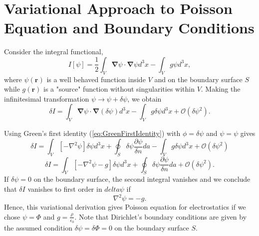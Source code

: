 \section{Variational Approach to Poisson Equation and Boundary Conditions}

Consider the integral functional,
\begin{equation}
I[\psi] = \frac{1}{2} \int_V \boldsymbol{\nabla} \psi \cdot \boldsymbol{\nabla} \psi d^3x - \int_V g\psi d^3x,
\end{equation}
where $\psi(\textbf{r})$ is a well behaved function inside $V$ and on the boundary surface $S$ while $g(\textbf{r})$ is a "source" function without singularities within $V$. Making the infinitesimal transformation $\psi \rightarrow \psi + \delta \psi $, we obtain
\begin{equation}
\delta I =  \int_V \boldsymbol{\nabla} \psi \cdot \boldsymbol{\nabla} ( \delta  \psi ) d^3x - \int_V g \delta \psi d^3x + \mathcal{O} (\delta \psi ^2).
\end{equation}

Using Green's first identity (\ref{eq:GreenFirstIdentity}) with $\phi = \delta \psi$ and $\psi = \psi$ gives
\begin{equation}
\delta I =  \int_V \left[  - \nabla ^2 \psi \right] \delta \psi d^3x + \oint_S \delta \psi \frac{\partial \psi}{\delta n} da - \int_V g \delta \psi d^3x + \mathcal{O} (\delta \psi ^2)
\end{equation}
\begin{equation}
\delta I =  \int_V \left[  - \nabla ^2 \psi - g \right] \delta \psi d^3x + \oint_S \delta \psi \frac{\partial \psi}{\delta n} da + \mathcal{O} (\delta \psi ^2).
\end{equation}
If $\delta \psi =0$ on the boundary surface, the second integral vanishes and we conclude that $\delta I$ vanishes to first order in $delta \psi$ if
\begin{equation}
 \nabla^2 \psi = -g.
 \end{equation} 
 Hence, this variational derivation gives Poisson equation for electrostatics if we chose $\psi = \Phi$ and $g = \frac{\rho}{\epsilon_0}$. Note that Dirichlet's boundary conditions are given by the assumed  condition $\delta \psi = \delta \Phi = 0$ on the boundary surface $S$.\\
 
 \bigskip
 
